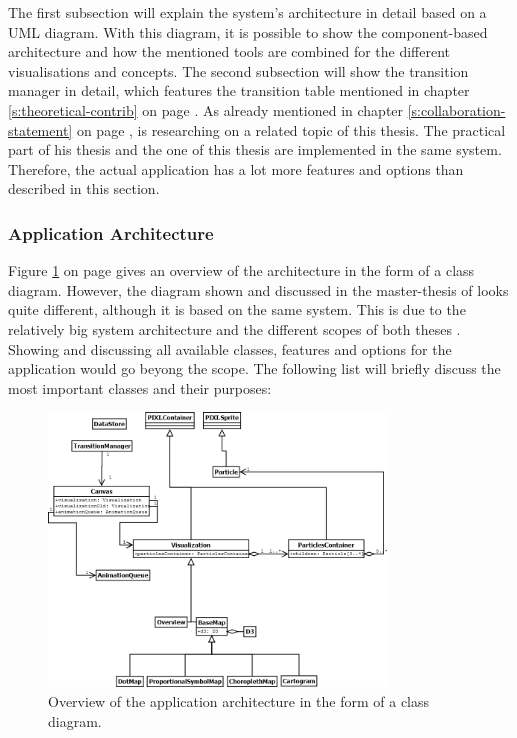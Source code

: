 The first subsection will explain the system's architecture in detail based on a \ac{UML} diagram. With this diagram, it is possible to show the component-based architecture and how the mentioned tools are combined for the different visualisations and concepts. The second subsection will show the transition manager in detail, which features the transition table mentioned in chapter \ref{s:theoretical-contrib} on page \pageref{s:theoretical-contrib}.
As already mentioned in chapter \ref{s:collaboration-statement} on page \pageref{s:collaboration-statement}, \citeauthor{Wanko2016} is researching on a related topic of this thesis. The practical part of his thesis and the one of this thesis are implemented in the same system. Therefore, the actual application has a lot more features and options than described in this section.

\subsubsection{Application Architecture}
Figure \ref{fig:uml-practical-approach} on page \pageref{fig:uml-practical-approach} gives an overview of the architecture in the form of a class diagram. However, the diagram shown and discussed in the master-thesis of \citeauthor{Wanko2016} looks quite different, although it is based on the same system. This is due to the relatively big system architecture and the different scopes of both theses . Showing and discussing all available classes, features and options for the application would go beyong the scope. The following list will briefly discuss the most important classes and their purposes:

\begin{figure}[!htb]
\centering
\includegraphics[width=0.8\textwidth,keepaspectratio]{images/results/dia.png}
\caption[
    Overview of the application architecture in the form of a class diagram.
]{Overview of the application architecture in the form of a class diagram.}
\label{fig:uml-practical-approach}
\end{figure}

